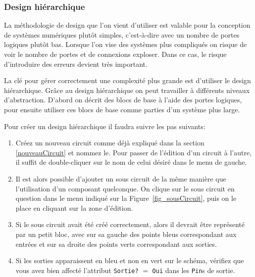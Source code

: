 \subsubsection{Design hiérarchique}
La méthodologie de design que l'on vient d'utiliser est valable pour la conception de systèmes numériques plutôt
simples, c'est-à-dire avec un nombre de portes logiques plutôt bas. Lorsque l'on vise des systèmes plus compliqués on
risque de voir le nombre de portes et de connexions exploser. Dans ce cas, le risque d'introduire des erreurs devient
très important.

La clé pour gérer correctement une complexité plus grande est d'utiliser le design hiérarchique. Grâce au design
hiérarchique on peut travailler à différents niveaux d'abstraction. D'abord on décrit des blocs de base à l'aide des
portes logiques, pour ensuite utiliser ces blocs de base comme parties d'un système plus large.

Pour créer un design hiérarchique il faudra suivre les pas
suivants:
\begin{enumerate}
\item Créez un nouveau circuit comme déjà expliqué dans la section \ref{nouveauCircuit} et nommez le.
Pour passer de l'édition d'un circuit à l'autre, il suffit de double-cliquer sur le nom de celui désiré dans le menu de
gauche.
\item Il est alors possible d'ajouter un sous circuit de la même manière que l'utilisation d'un
composant quelconque. On clique sur le sous circuit en question dans le menu indiqué sur la Figure~\ref{fig_sousCircuit}, puis on le
place en cliquant sur la zone d'édition.
\item Si le sous circuit avait été créé correctement, alors il devrait être représenté par un petit bloc, avec
sur sa gauche des points bleus correspondant aux entrées et sur sa droite des points verts correspondant aux sorties.
\item Si les sorties apparaissent en bleu et non en vert sur le schéma, vérifiez que vous avez bien affecté l'attribut
\texttt{Sortie?} $=$ \texttt{Oui} dans les \texttt{Pin}s de sortie.

\end{enumerate}

